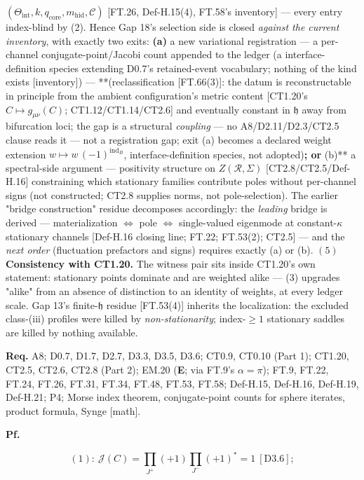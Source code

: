 \begin{theorem}
$(\Theta_{\mathrm{int}},k,q_{\mathrm{core}},m_{\mathrm{hid}},\mathcal C)$ [FT.26, Def-H.15(4), FT.58's inventory] — every entry index-blind by (2). Hence Gap 18's selection side is closed \textit{against the current inventory}, with exactly two exits: \textbf{(a)} a new variational registration — a per-channel conjugate-point/Jacobi count appended to the ledger (a interface-definition species extending D0.7's retained-event vocabulary; nothing of the kind exists [inventory]) — **(reclassification [FT.66(3)]: the datum is reconstructable in principle from the ambient configuration's metric content [CT1.20's $C\mapsto g_{\mu\nu}(C)$; CT1.12/CT1.14/CT2.6] and eventually constant in $\mathfrak h$ away from bifurcation loci; the gap is a structural \textit{coupling} — no A8/D2.11/D2.3/CT2.5 clause reads it — not a registration gap; exit (a) becomes a declared weight extension $w\mapsto w\,(-1)^{\operatorname{ind}_B}$, interface-definition species, not adopted)\textbf{; or }(b)** a spectral-side argument — positivity structure on $Z(\mathcal R,\Sigma)$ [CT2.8/CT2.5/Def-H.16] constraining which stationary families contribute poles without per-channel signs (not constructed; CT2.8 supplies norms, not pole-selection). The earlier "bridge construction" residue decomposes accordingly: the \textit{leading} bridge is derived — materialization $\iff$ pole $\iff$ single-valued eigenmode at constant-$\kappa$ stationary channels [Def-H.16 closing line; FT.22; FT.53(2); CT2.5] — and the \textit{next order} (fluctuation prefactors and signs) requires exactly (a) or (b). $(5)$ \textbf{Consistency with CT1.20.} The witness pair sits inside CT1.20's own statement: stationary points dominate and are weighted alike — (3) upgrades "alike" from an absence of distinction to an identity of weights, at every ledger scale. Gap 13's finite-$\mathfrak h$ residue [FT.53(4)] inherits the localization: the excluded class-(iii) profiles were killed by \textit{non-stationarity}; index-$\ge1$ stationary saddles are killed by nothing available.

\textbf{Req.} A8; D0.7, D1.7, D2.7, D3.3, D3.5, D3.6; CT0.9, CT0.10 (Part 1); CT1.20, CT2.5, CT2.6, CT2.8 (Part 2); EM.20 (\textbf{E}; via FT.9's $\alpha=\pi$); FT.9, FT.22, FT.24, FT.26, FT.31, FT.34, FT.48, FT.53, FT.58; Def-H.15, Def-H.16, Def-H.19, Def-H.21; P4; Morse index theorem, conjugate-point counts for sphere iterates, product formula, Synge [math].

\textbf{Pf.}

\[
(1):\ \mathcal J(C)=\prod_{J^+}(+1)\prod_{J^-}(+1)^*=1\ [\mathrm{D3.6}];
\]


\end{theorem}
